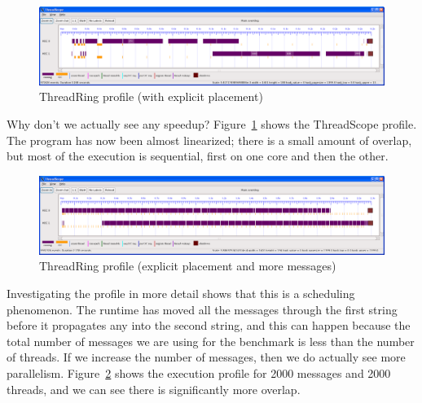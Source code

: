 \begin{figure}
\begin{center}
\includegraphics[scale=0.3]{threadring2.png}
\end{center}
\caption{ThreadRing profile (with explicit placement)}
\label{f:threadring2}
\end{figure}

Why don't we actually see any speedup?
Figure~\ref{f:threadring2} shows the ThreadScope profile.
The program has now been almost linearized; there is a small amount of
overlap, but most of the execution is sequential, first on one core
and then the other.

\begin{figure}
\begin{center}
\includegraphics[scale=0.3]{threadring3.png}
\end{center}
\caption{ThreadRing profile (explicit placement and more messages)}
\label{f:threadring3}
\end{figure}

Investigating the profile in more detail shows that this is a
scheduling phenomenon.  The runtime has moved all the messages through
the first string before it propagates any into the second string, and
this can happen because the total number of messages we are using for
the benchmark is less than the number of threads.  If we increase the
number of messages, then we do actually see more parallelism.
Figure~\ref{f:threadring3} shows the execution profile for 2000
messages and 2000 threads, and we can see there is significantly more
overlap.
